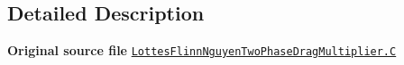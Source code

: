 \subsection{Detailed Description}
{\bfseries Original source file} \href{../../../home/carlo/data/GeN-Foam/GeN-Foam_ffn/GeN-Foam/GeN-Foam/classes/thermalHydraulics/src/physicsModels/dragModels/twoPhaseDragMultiplierModels/LottesFlinnNguyen/LottesFlinnNguyenTwoPhaseDragMultiplier.C}{\tt Lottes\+Flinn\+Nguyen\+Two\+Phase\+Drag\+Multiplier.\+C} 